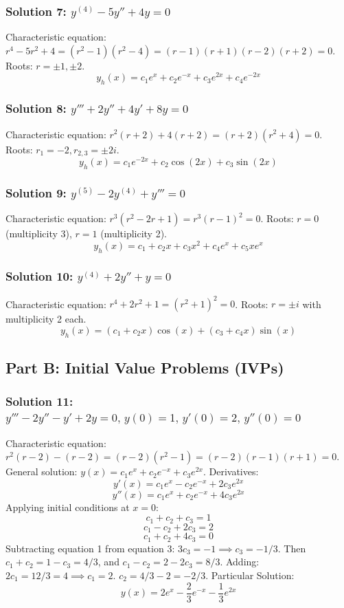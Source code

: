 \documentclass[11pt,letterpaper]{article}
\begin{document}
\subsubsection*{Solution 7: $y^{(4)} - 5y'' + 4y = 0$}
Characteristic equation: $r^4 - 5r^2 + 4 = (r^2 - 1)(r^2 - 4) = (r-1)(r+1)(r-2)(r+2) = 0$.
Roots: $r = \pm 1, \pm 2$.
\[ y_h(x) = c_1 e^x + c_2 e^{-x} + c_3 e^{2x} + c_4 e^{-2x} \]

\subsubsection*{Solution 8: $y''' + 2y'' + 4y' + 8y = 0$}
Characteristic equation: $r^2(r+2) + 4(r+2) = (r+2)(r^2+4) = 0$.
Roots: $r_1 = -2, r_{2,3} = \pm 2i$.
\[ y_h(x) = c_1 e^{-2x} + c_2 \cos(2x) + c_3 \sin(2x) \]

\subsubsection*{Solution 9: $y^{(5)} - 2y^{(4)} + y''' = 0$}
Characteristic equation: $r^3(r^2 - 2r + 1) = r^3(r-1)^2 = 0$.
Roots: $r = 0$ (multiplicity 3), $r = 1$ (multiplicity 2).
\[ y_h(x) = c_1 + c_2 x + c_3 x^2 + c_4 e^x + c_5 x e^x \]

\subsubsection*{Solution 10: $y^{(4)} + 2y'' + y = 0$}
Characteristic equation: $r^4 + 2r^2 + 1 = (r^2 + 1)^2 = 0$.
Roots: $r = \pm i$ with multiplicity 2 each.
\[ y_h(x) = (c_1 + c_2 x) \cos(x) + (c_3 + c_4 x) \sin(x) \]

\subsection*{Part B: Initial Value Problems (IVPs)}

\subsubsection*{Solution 11: $y''' - 2y'' - y' + 2y = 0, \, y(0)=1, \, y'(0)=2, \, y''(0)=0$}
Characteristic equation: $r^2(r-2) - (r-2) = (r-2)(r^2-1) = (r-2)(r-1)(r+1) = 0$.
General solution: $y(x) = c_1 e^x + c_2 e^{-x} + c_3 e^{2x}$.
Derivatives:
\[ y'(x) = c_1 e^x - c_2 e^{-x} + 2c_3 e^{2x} \]
\[ y''(x) = c_1 e^x + c_2 e^{-x} + 4c_3 e^{2x} \]
Applying initial conditions at $x=0$:
\[ c_1 + c_2 + c_3 = 1 \]
\[ c_1 - c_2 + 2c_3 = 2 \]
\[ c_1 + c_2 + 4c_3 = 0 \]
Subtracting equation 1 from equation 3: $3c_3 = -1 \implies c_3 = -1/3$.
Then $c_1 + c_2 = 1 - c_3 = 4/3$, and $c_1 - c_2 = 2 - 2c_3 = 8/3$.
Adding: $2c_1 = 12/3 = 4 \implies c_1 = 2$.
$c_2 = 4/3 - 2 = -2/3$.
Particular Solution:
\[ y(x) = 2e^x - \frac{2}{3}e^{-x} - \frac{1}{3}e^{2x} \]
\end{document}
